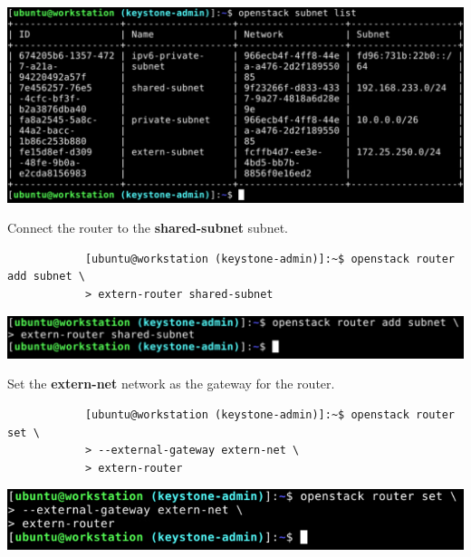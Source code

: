 \documentclass[letterpaper, 12pt]{article}
\begin{document}
\begin{enumerate}
\begin{labstep}
        \begin{center}
            \includegraphics[width=\linewidth]{images/part1/step18.png}
        \end{center}
    \end{labstep}

    \begin{labstep}
        Connect the router to the \textbf{shared-subnet} subnet.
        \begin{lstlisting}
            [ubuntu@workstation (keystone-admin)]:~$ openstack router add subnet \
            > extern-router shared-subnet
        \end{lstlisting}

        \begin{center}
            \includegraphics[width=\linewidth]{images/part1/step19.png}
        \end{center}
    \end{labstep}

    \begin{labstep}
        Set the \textbf{extern-net} network as the gateway for the router.
        \begin{lstlisting}
            [ubuntu@workstation (keystone-admin)]:~$ openstack router set \
            > --external-gateway extern-net \
            > extern-router
        \end{lstlisting}

        \begin{center}
            \includegraphics[width=\linewidth]{images/part1/step20.png}
        \end{center}
    \end{labstep}


\end{enumerate}
\end{document}
